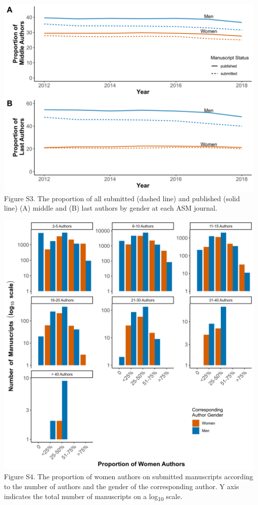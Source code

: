 \documentclass[11pt,]{article}
\begin{document}
\newpage

\includegraphics{Figure_S3.png} Figure S3. The proportion of all
submitted (dashed line) and published (solid line) (A) middle and (B)
last authors by gender at each ASM journal.

\newpage

\includegraphics{Figure_S4.png} Figure S4. The proportion of women
authors on submitted manuscripts according to the number of authors and
the gender of the corresponding author. Y axis indicates the total
number of manuscripts on a log\textsubscript{10} scale.
\end{document}
